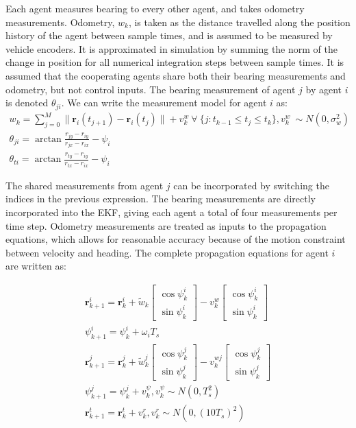 \documentclass{aiaa-tc}
\newcommand{\B}[1]{\textbf{#1}} %
\begin{document}
Each agent measures bearing to every other agent, and takes odometry measurements. Odometry, $w_k$, is taken as the distance travelled along the position history of the agent between sample times, and is assumed to be measured by vehicle encoders. It is approximated in simulation by summing the norm of the change in position for all numerical integration steps between sample times. It is assumed that the cooperating agents share both their bearing measurements and odometry, but not control inputs. The bearing measurement of agent $j$ by agent $i$ is denoted $\theta_{ji}$. We can write the measurement model for agent $i$ as:
\begin{align}
w_k = \sum\limits_{j=0}^{M} \| \B{r}_i(t_{j+1}) - \B{r}_i(t_j) \| + v^w_k \ \forall \ \{j : t_{k-1} \leq t_j \leq t_{k}\}, v^w_k \ \sim N(0,\sigma_w^2) \\
\theta_{ji} = \arctan{\frac{r_{jy}-r_{iy}}{r_{jx}-r_{ix}}} - \psi_i \\
\theta_{ti} = \arctan{\frac{r_{ty}-r_{iy}}{r_{tx}-r_{ix}}} - \psi_i
\end{align}

The shared measurements from agent $j$ can be incorporated by switching the indices in the previous expression. The bearing measurements are directly incorporated into the EKF, giving each agent a total of four measurements per time step. Odometry measurements are treated as inputs to the propagation equations, which allows for reasonable accuracy because of the motion constraint between velocity and heading. The complete propagation equations for agent $i$ are written as:

\begin{align}
\B{r}^i_{k+1} = \B{r}^i_k + \tilde{w}_k \begin{bmatrix}
\cos{\psi^i_k}\\
\sin{\psi^i_k}
\end{bmatrix} - v^w_k\begin{bmatrix}
\cos{\psi^i_k}\\
\sin{\psi^i_k}
\end{bmatrix}\\
\psi^i_{k+1} = \psi^i_k + \omega_i T_s\\
\B{r}^j_{k+1} = \B{r}^j_k + \tilde{w}^j_k \begin{bmatrix}
\cos{\psi^j_k}\\
\sin{\psi^j_k}
\end{bmatrix} - v^{wj}_k\begin{bmatrix}
\cos{\psi^j_k}\\
\sin{\psi^j_k}
\end{bmatrix}\\
\psi^j_{k+1} = \psi^j_k + v^\psi_k, v^\psi_k \sim N(0,T_s^2)\\
\B{r}^t_{k+1} = \B{r}^t_k + v^r_k, v^r_k \sim N(0,(10T_s)^2)
\end{align}
\end{document}

